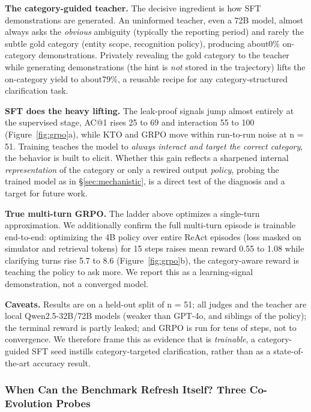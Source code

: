 \textbf{The category-guided teacher.} The decisive ingredient is how SFT
demonstrations are generated. An uninformed teacher, even a 72B model, almost
always asks the \emph{obvious} ambiguity (typically the reporting period) and
rarely the subtle gold category (entity scope, recognition policy), producing
about0\% on-category demonstrations. Privately revealing the gold category to the teacher
while generating demonstrations (the hint is \emph{not} stored in the trajectory)
lifts the on-category yield to about79\%, a reusable recipe for any category-structured
clarification task.



\textbf{SFT does the heavy lifting.} The leak-proof signals jump almost entirely
at the supervised stage, AC@1 rises 25 to 69 and interaction 55 to 100
(Figure~\ref{fig:grpo}a), while KTO and GRPO move within run-to-run noise at
n = 51. Training teaches the model to \emph{always interact and target the
correct category}, the behavior \fininteract is built to elicit. Whether this gain
reflects a sharpened internal \emph{representation} of the category or only a rewired
output \emph{policy}, probing the trained model as in \S\ref{sec:mechanistic}, is
a direct test of the diagnosis and a target for future work.

\textbf{True multi-turn GRPO.} The ladder above optimizes a single-turn
approximation. We additionally confirm the full multi-turn episode is trainable
end-to-end: optimizing the 4B policy over entire ReAct episodes (loss masked on
simulator and retrieval tokens) for 15 steps raises mean reward 0.55 to 1.08
while clarifying turns rise 5.7 to 8.6 (Figure~\ref{fig:grpo}b), the category-aware
reward is teaching the policy to ask more. We report this as a learning-signal
demonstration, not a converged model.

\textbf{Caveats.} Results are on a held-out split of n = 51; all judges and the
teacher are local Qwen2.5-32B/72B models (weaker than GPT-4o, and siblings of the
policy); the terminal reward is partly leaked; and GRPO is run for tens of steps,
not to convergence. We therefore frame this as evidence that \fininteract is
\emph{trainable}, a category-guided SFT seed instills category-targeted
clarification, rather than as a state-of-the-art accuracy result.



\subsubsection{When Can the Benchmark Refresh Itself? Three Co-Evolution Probes}
\label{sec:coevolve}

